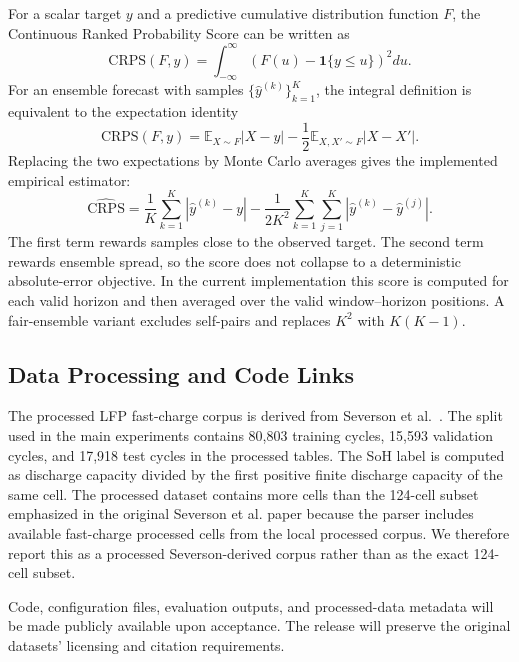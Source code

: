 \documentclass[conference]{IEEEtran}
\begin{document}
For a scalar target $y$ and a predictive cumulative distribution function
$F$, the Continuous Ranked Probability Score can be written as
\begin{equation}
\mathrm{CRPS}(F,y)
=
\int_{-\infty}^{\infty}
\left(F(u)-\mathbf{1}\{y\le u\}\right)^2du .
\end{equation}
For an ensemble forecast with samples $\{\hat y^{(k)}\}_{k=1}^{K}$, the
integral definition is equivalent to the expectation identity
\begin{equation}
\mathrm{CRPS}(F,y)
=
\mathbb{E}_{X\sim F}|X-y|
-
\frac{1}{2}\mathbb{E}_{X,X'\sim F}|X-X'|.
\end{equation}
Replacing the two expectations by Monte Carlo averages gives the implemented
empirical estimator:
\begin{equation*}
\widehat{\mathrm{CRPS}}
=
\frac{1}{K}\sum_{k=1}^{K}|\hat y^{(k)}-y|
-
\frac{1}{2K^2}\sum_{k=1}^{K}\sum_{j=1}^{K}
|\hat y^{(k)}-\hat y^{(j)}|.
\end{equation*}
The first term rewards samples close to the observed target. The second term
rewards ensemble spread, so the score does not collapse to a deterministic
absolute-error objective. In the current implementation this score is computed
for each valid horizon and then averaged over the valid window--horizon
positions. A fair-ensemble variant excludes self-pairs and replaces $K^2$
with $K(K-1)$.

\subsection{Data Processing and Code Links}
\label{app:data-processing}

The processed LFP fast-charge corpus is derived from Severson
et al.~\cite{severson2019}. The split used in the main experiments contains
80,803 training cycles, 15,593 validation cycles, and 17,918 test cycles in
the processed tables. The SoH label is computed as discharge capacity divided
by the first positive finite discharge capacity of the same cell. The
processed dataset contains more cells than the 124-cell subset emphasized in
the original Severson et al. paper because the parser includes available
fast-charge processed cells from the local processed corpus. We therefore
report this as a processed Severson-derived corpus rather than as the exact
124-cell subset.

Code, configuration files, evaluation outputs, and processed-data metadata
will be made publicly available upon acceptance. The release will preserve
the original datasets' licensing and citation requirements.
\end{document}
